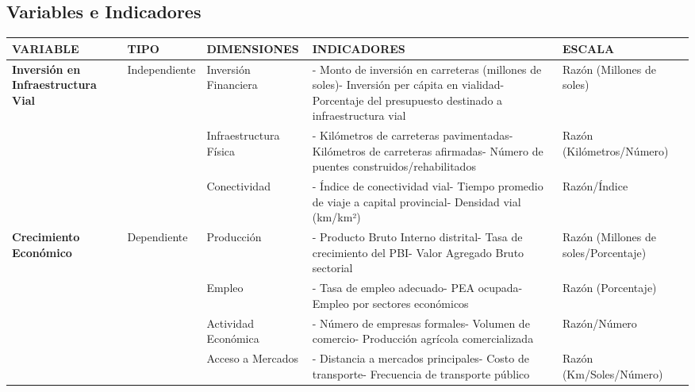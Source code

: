\documentclass[
  man,
  floatsintext,
  longtable,
  a4paper,
  nolmodern,
  notxfonts,
  notimes,
  12pt,
  colorlinks=true,linkcolor=blue,citecolor=blue,urlcolor=blue]{apa7}
\newcounter{none} %
\begin{document}
\subsection{Variables e Indicadores}\label{variables-e-indicadores-3}

{\def\LTcaptype{none} %
\begin{longtable}[]{@{}
  >{\raggedright\arraybackslash}p{}
  >{\raggedright\arraybackslash}p{}
  >{\raggedright\arraybackslash}p{}
  >{\raggedright\arraybackslash}p{}
  >{\raggedright\arraybackslash}p{}@{}}
\toprule\noalign{}
\begin{minipage}[b]{\linewidth}\raggedright
VARIABLE
\end{minipage} & \begin{minipage}[b]{\linewidth}\raggedright
TIPO
\end{minipage} & \begin{minipage}[b]{\linewidth}\raggedright
DIMENSIONES
\end{minipage} & \begin{minipage}[b]{\linewidth}\raggedright
INDICADORES
\end{minipage} & \begin{minipage}[b]{\linewidth}\raggedright
ESCALA
\end{minipage} \\
\midrule\noalign{}
\endhead
\bottomrule\noalign{}
\endlastfoot
\textbf{Inversión en Infraestructura Vial} & Independiente & Inversión
Financiera & - Monto de inversión en carreteras (millones de soles)-
Inversión per cápita en vialidad- Porcentaje del presupuesto destinado a
infraestructura vial & Razón (Millones de soles) \\
& & Infraestructura Física & - Kilómetros de carreteras pavimentadas-
Kilómetros de carreteras afirmadas- Número de puentes
construidos/rehabilitados & Razón (Kilómetros/Número) \\
& & Conectividad & - Índice de conectividad vial- Tiempo promedio de
viaje a capital provincial- Densidad vial (km/km²) & Razón/Índice \\
\textbf{Crecimiento Económico} & Dependiente & Producción & - Producto
Bruto Interno distrital- Tasa de crecimiento del PBI- Valor Agregado
Bruto sectorial & Razón (Millones de soles/Porcentaje) \\
& & Empleo & - Tasa de empleo adecuado- PEA ocupada- Empleo por sectores
económicos & Razón (Porcentaje) \\
& & Actividad Económica & - Número de empresas formales- Volumen de
comercio- Producción agrícola comercializada & Razón/Número \\
& & Acceso a Mercados & - Distancia a mercados principales- Costo de
transporte- Frecuencia de transporte público & Razón
(Km/Soles/Número) \\
\end{longtable}
}
\end{document}

